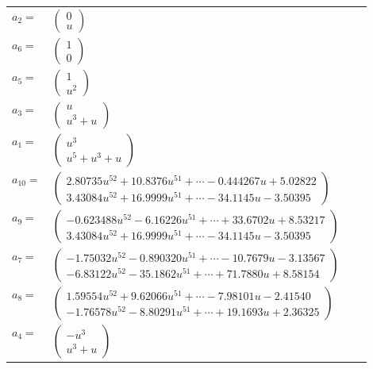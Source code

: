 \documentclass[1p]{elsarticle_modified}
\theoremstyle{definition}
\begin{document}
\begin{tabular}{m{7pt} m{180pt} m{7pt} m{180pt} }
\flushright $a_{2}=$&$\begin{pmatrix}0\\u\end{pmatrix}$ \\
\flushright $a_{6}=$&$\begin{pmatrix}1\\0\end{pmatrix}$ \\
\flushright $a_{5}=$&$\begin{pmatrix}1\\u^2\end{pmatrix}$ \\
\flushright $a_{3}=$&$\begin{pmatrix}u\\u^3+u\end{pmatrix}$ \\
\flushright $a_{1}=$&$\begin{pmatrix}u^3\\u^5+u^3+u\end{pmatrix}$ \\
\flushright $a_{10}=$&$\begin{pmatrix}2.80735 u^{52}+10.8376 u^{51}+\cdots-0.444267 u+5.02822\\3.43084 u^{52}+16.9999 u^{51}+\cdots-34.1145 u-3.50395\end{pmatrix}$ \\
\flushright $a_{9}=$&$\begin{pmatrix}-0.623488 u^{52}-6.16226 u^{51}+\cdots+33.6702 u+8.53217\\3.43084 u^{52}+16.9999 u^{51}+\cdots-34.1145 u-3.50395\end{pmatrix}$ \\
\flushright $a_{7}=$&$\begin{pmatrix}-1.75032 u^{52}-0.890320 u^{51}+\cdots-10.7679 u-3.13567\\-6.83122 u^{52}-35.1862 u^{51}+\cdots+71.7880 u+8.58154\end{pmatrix}$ \\
\flushright $a_{8}=$&$\begin{pmatrix}1.59554 u^{52}+9.62066 u^{51}+\cdots-7.98101 u-2.41540\\-1.76578 u^{52}-8.80291 u^{51}+\cdots+19.1693 u+2.36325\end{pmatrix}$ \\
\flushright $a_{4}=$&$\begin{pmatrix}- u^3\\u^3+u\end{pmatrix}$ \\

\end{tabular}
\end{document}
